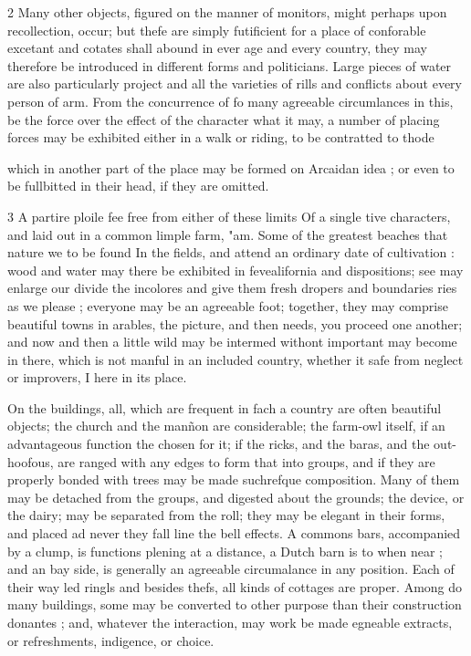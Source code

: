 \documentclass[10pt]{article}
\begin{document}
\begin{multicols}{2}
Many other objects, figured on the manner of monitors, might perhaps upon recollection, occur; but thefe are simply futificient for a place of conforable excetant and cotates shall abound in ever age and every country, they may therefore be introduced in different forms and politicians. Large pieces of water are also particularly project and all the varieties of rills and conflicts about every person of arm. From the concurrence of fo many agreeable circumlances in this, be the force over the effect of the character what it may, a number of placing forces may be exhibited either in a walk or riding, to be contratted to thode

which in another part of the place may be formed on Arcaidan idea ; or even to be fullbitted in their head, if they are omitted.

3 A partire ploile fee free from either of these limits Of a single tive characters, and laid out in a common limple farm, "am. Some of the greatest beaches that nature we to be found In the fields, and attend an ordinary date of cultivation : wood and water may there be exhibited in fevealifornia and dispositions; see may enlarge our divide the incolores and give them fresh dropers and boundaries ries as we please ; everyone may be an agreeable foot; together, they may comprise beautiful towns in arables, the picture, and then needs, you proceed one another; and now and then a little wild may be intermed withont important may become in there, which is not manful in an included country, whether it safe from neglect or improvers, I here in its place.

On the buildings, all, which are frequent in fach a country are often beautiful objects; the church and the manñon are considerable; the farm-owl itself, if an advantageous function the chosen for it; if the ricks, and the baras, and the out-hoofous, are ranged with any edges to form that into groups, and if they are properly bonded with trees may be made suchrefque composition. Many of them may be detached from the groups, and digested about the grounds; the device, or the dairy; may be separated from the roll; they may be elegant in their forms, and placed ad never they fall line the bell effects. A commons bars, accompanied by a clump, is functions plening at a distance, a Dutch barn is to when near ; and an bay side, is generally an agreeable circumalance in any position. Each of their way led ringls and besides thefs, all kinds of cottages are proper. Among do many buildings, some may be converted to other purpose than their construction donantes ; and, whatever the interaction, may work be made egneable extracts, or refreshments, indigence, or choice.


\end{multicols}
\end{document}
